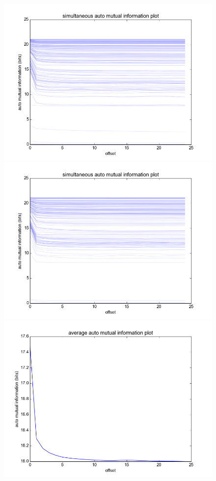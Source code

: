 \documentclass[12pt]{article}
\begin{document}
\begin{figure}\label{fig:lag_ami}
  \begin{center}
    \includegraphics[scale=0.4]{wests_ami_mc}
    \includegraphics[scale=0.4]{norths_ami_mc}
    \includegraphics[scale=0.4]{wests_ami_summary}

\end{center}
\end{figure}
\end{document}
